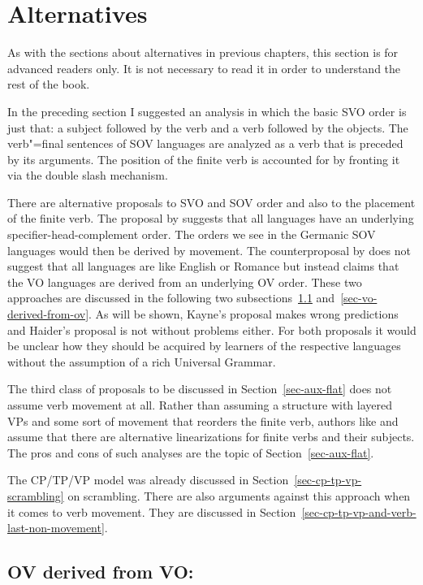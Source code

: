 \section{Alternatives}

As with the sections about alternatives in previous chapters, this section is for advanced readers
only. It is not necessary to read it in order to understand the rest of the book.

In the preceding section I suggested an analysis in which the basic SVO order is just that: a
subject followed by the verb and a verb followed by the objects. The verb"=final sentences of SOV
languages are analyzed as a verb that is preceded by its arguments. The position of the finite verb
is accounted for by fronting it via the double slash mechanism.

\largerpage[1]
There are alternative proposals to SVO and SOV order and also to the placement of the finite
verb. The proposal by \citet{Kayne94a-u} suggests that all languages have an underlying
specifier-head-complement order. The orders we see in the Germanic SOV languages would then be
derived by movement. The counterproposal by \citet{Haider2000a,Haider2020a} does not suggest that all languages are
like English or Romance but instead claims that the VO languages are derived from an underlying OV
order. These two approaches are discussed in the following two subsections~\ref{sec-ov-derived-from-vo} and~\ref{sec-vo-derived-from-ov}. As will be shown,
Kayne's proposal\pagebreak{} makes wrong predictions and Haider's proposal is not without problems either. For
both proposals it would be unclear how they should be acquired by learners of the respective
languages without the assumption of a rich Universal Grammar.

The third class of proposals to be discussed in Section~\ref{sec-aux-flat} does not assume verb movement at
all. Rather than assuming a structure with layered VPs and some sort of movement that reorders the
finite verb, authors like \citet*{GKPS85a} and \citet{Sag2020a} assume that there are alternative
linearizations for finite verbs and their subjects. The pros and cons of such analyses are the topic
of Section~\ref{sec-aux-flat}.

The CP/TP/VP model was already discussed in Section~\ref{sec-cp-tp-vp-scrambling} on scrambling. 
There are also arguments against this approach when it comes to verb movement. They are discussed in
Section~\ref{sec-cp-tp-vp-and-verb-last-non-movement}.  

\subsection{OV derived from VO: \citet{Kayne94a-u}}
\label{sec-ov-derived-from-vo}


